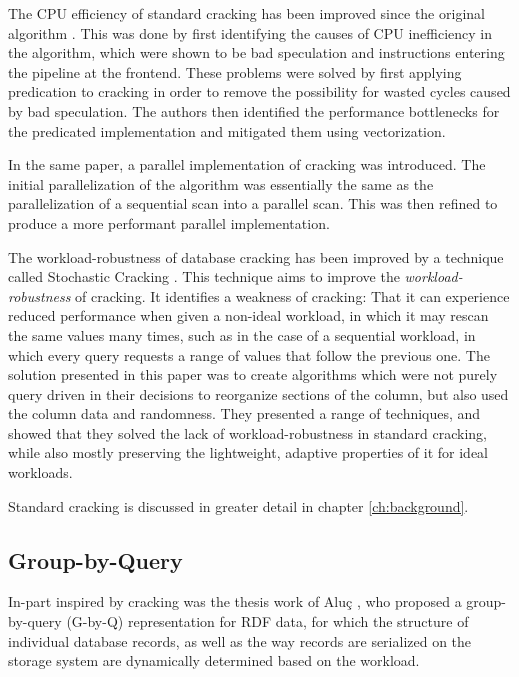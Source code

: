 The CPU efficiency of standard cracking has been improved since the original algorithm \cite{Pirk:2014:DCF:2619228.2619232}. This was done by first identifying the causes of CPU inefficiency in the algorithm, which were shown to be bad speculation and instructions entering the pipeline at the frontend. These problems were solved by first applying predication to cracking in order to remove the possibility for wasted cycles caused by bad speculation. The authors then identified the performance bottlenecks for the predicated implementation and mitigated them using vectorization.

In the same paper, a parallel implementation of cracking was introduced. The initial parallelization of the algorithm was essentially the same as the parallelization of a sequential scan into a parallel scan. This was then refined to produce a more performant parallel implementation.

The workload-robustness of database cracking has been improved by a technique called Stochastic Cracking \cite{Halim:2012:SDC:2168651.2168652}. This technique aims to improve the \textit{workload-robustness} of cracking. It identifies a weakness of cracking: That it can experience reduced performance when given a non-ideal workload, in which it may rescan the same values many times, such as in the case of a sequential workload, in which every query requests a range of values that follow the previous one. The solution presented in this paper was to create algorithms which were not purely query driven in their decisions to reorganize sections of the column, but also used the column data and randomness. They presented a range of techniques, and showed that they solved the lack of workload-robustness in standard cracking, while also mostly preserving the lightweight, adaptive properties of it for ideal workloads.

Standard cracking is discussed in greater detail in chapter \ref{ch:background}.

\subsection{Group-by-Query}

In-part inspired by cracking was the thesis work of Aluç \cite{DBLP:phd/basesearch/Aluc15}, who proposed a group-by-query (G-by-Q) representation for RDF data, for which the structure of individual database records, as well as the way records are serialized on the storage system are dynamically determined based on the workload. 


